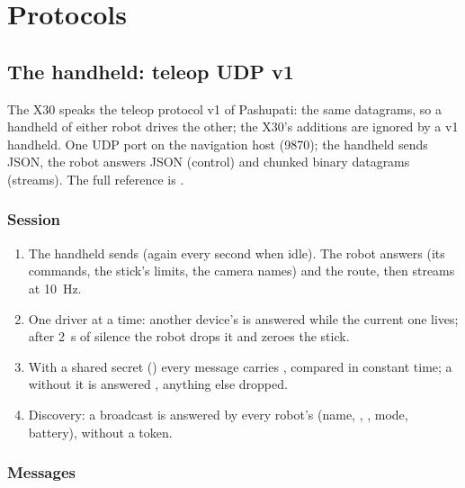 \chapter{Protocols}
\label{ch:a-protocols}

\section{The handheld: teleop UDP v1}

The X30 speaks the teleop protocol v1 of Pashupati: the same datagrams, so a handheld of either
robot drives the other; the X30's additions are ignored by a v1 handheld. One UDP port on the
navigation host (\num{9870}); the handheld sends JSON, the robot answers JSON (control) and chunked
binary datagrams (streams). The full reference is .

\subsection{Session}

\begin{enumerate}
  \item The handheld sends  (again every second when idle). The robot answers
     (its commands, the stick's limits, the camera names) and the route, then streams
     at \SI{10}{Hz}.
  \item One driver at a time: another device's  is answered  while the
    current one lives; after \SI{2}{s} of silence the robot drops it and zeroes the stick.
  \item With a shared secret () every message carries , compared in
    constant time; a  without it is answered , anything else dropped.
  \item Discovery: a broadcast  is answered by every robot's 
    (name, , , mode, battery), without a token.
\end{enumerate}

\subsection{Messages}

